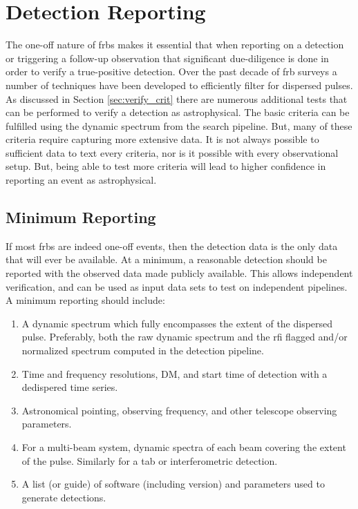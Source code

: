 \documentclass[a4paper,fleqn,usenatbib]{mnras}
\begin{document}
\section{Detection Reporting}
\label{sec:detect_report}

The one-off nature of \glspl{frb} makes it essential that when reporting on a
detection or triggering a follow-up observation that significant due-diligence
is done in order to verify a true-positive detection. Over the past decade of
\gls{frb} surveys a number of techniques have been developed to efficiently
filter for dispersed pulses. As discussed in Section \ref{sec:verify_crit} there
are numerous additional tests that can be performed to verify a detection as
astrophysical. The basic criteria can be fulfilled using the dynamic spectrum
from the search pipeline. But, many of these criteria require capturing more
extensive data. It is not always possible to sufficient data to text every
criteria, nor is it possible with every observational setup. But, being able to
test more criteria will lead to higher confidence in reporting an event as
astrophysical.

\subsection{Minimum Reporting}

If most \glspl{frb} are indeed one-off events, then the detection data is the
only data that will ever be available.  At a minimum, a reasonable detection
should be reported with the observed data made publicly available.  This allows
independent verification, and can be used as input data sets to test on
independent pipelines.  A minimum reporting should include:

\begin{enumerate}
    \item A dynamic spectrum which fully encompasses the extent of the dispersed
    pulse. Preferably, both the raw dynamic spectrum and the \gls{rfi} flagged
    and/or normalized spectrum computed in the detection pipeline.
    \item Time and frequency resolutions, DM, and start time of detection with a
    dedispered time series.
    \item Astronomical pointing, observing frequency, and other telescope
    observing parameters.
    \item For a multi-beam system, dynamic spectra of each beam covering the
    extent of the pulse. Similarly for a \gls{tab} or interferometric detection.
    \item A list (or guide) of software (including version) and parameters used
    to generate detections.
\end{enumerate}
\end{document}
